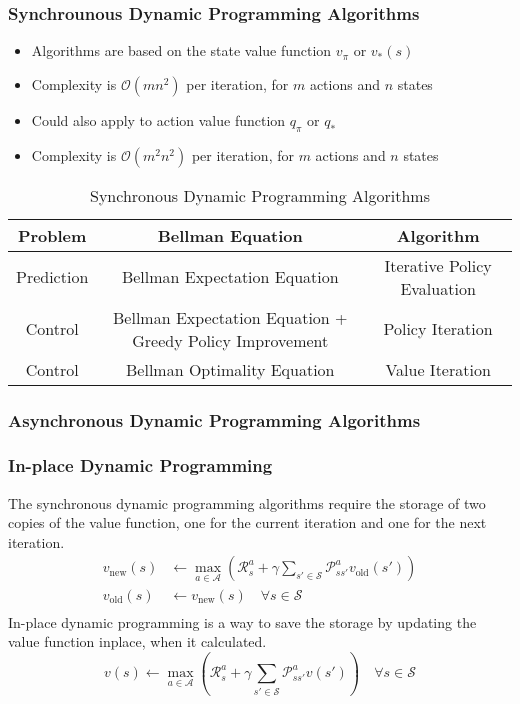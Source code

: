 \subsubsection{Synchrounous Dynamic Programming Algorithms}
\begin{itemize}
    \item Algorithms are based on the state value function \(v_{\pi}\) or \(v_{\ast} (s)\)
    \item Complexity is \(\mathcal{O}(mn^{2})\) per iteration, for \(m\) actions and \(n\) states
    \item Could also apply to action value function \(q_{\pi}\) or \(q_{\ast}\)
    \item Complexity is \(\mathcal{O}(m^{2} n^{2})\) per iteration, for \(m\) actions and \(n\) states
    \end{itemize}
\begin{table}[H]
    \centering
    \begin{tabular}{c|c|c}
        \hline
         \textbf{Problem} & \textbf{Bellman Equation} & \textbf{Algorithm} \\
         \hline
         Prediction & Bellman Expectation Equation & Iterative Policy Evaluation \\
         \hline
         Control & Bellman Expectation Equation + Greedy Policy Improvement & Policy Iteration \\
         \hline
            Control & Bellman Optimality Equation & Value Iteration \\
         \hline
    \end{tabular}
    \caption{Synchronous Dynamic Programming Algorithms}
    \label{tab:synchronous_dynamic_programming_algorithms}
\end{table}

\subsubsection{Asynchronous Dynamic Programming Algorithms}

\subsubsection*{In-place Dynamic Programming}
The synchronous dynamic programming algorithms require the storage of two copies of the value
function, one for the current iteration and one for the next iteration.
\[
    \begin{aligned}
        v_{\text{new}}(s) &\gets \max_{a \in \mathcal{A}} \left(   
        \mathcal{R} _{s}^{a} + \gamma
        \sum\limits_{s' \in \mathcal{S}} \mathcal{P}_{ss'}^{a} v_{\text{old}}(s') \right) \\
        v_{\text{old}}(s) &\gets v_{\text{new}}(s) \quad \forall s \in \mathcal{S} \\
    \end{aligned}
\]
In-place dynamic programming is a way to save the storage by updating the value function inplace,
when it calculated.
\[
    v(s) \gets \max_{a \in \mathcal{A}} \left(
        \mathcal{R}_{s}^{a} + \gamma \sum\limits_{s' \in \mathcal{S}} \mathcal{P}_{ss'}^{a} v(s')
    \right) \quad \forall s \in \mathcal{S}
\]


